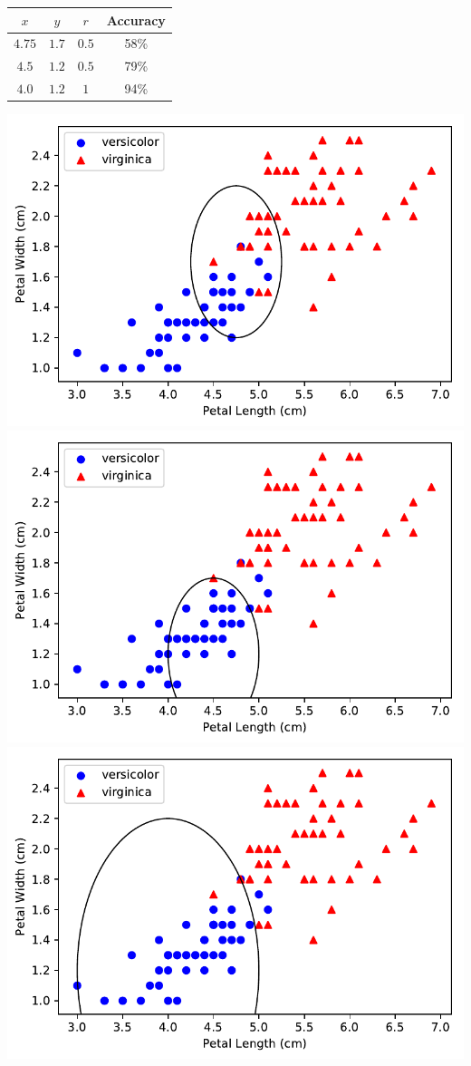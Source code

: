 \documentclass[letterpaper]{article}
\begin{document}
\begin{center}
\begin{tabular}{|c|c|c|c|}
\hline
$x$ & $y$ & $r$ & Accuracy\\
\hline
$4.75$ & $1.7$ & $0.5$ & 58\%\\
\hline
$4.5$ & $1.2$ & $0.5$ & 79\%\\
\hline
$4.0$ & $1.2$ & $1$ & 94\%\\
\hline
\end{tabular}
\includegraphics{plot_1d_1.pdf}
\includegraphics{plot_1d_2.pdf}
\includegraphics{plot_1d_3.pdf}
\end{center}
\end{document}

